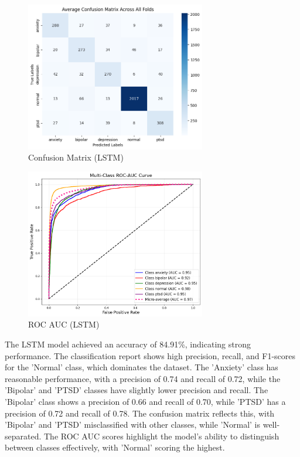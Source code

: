 \vspace{0.1em}

\begin{figure}[h!]  
    \centering
    \includegraphics[width=0.7\textwidth]{Images/LSTM Confusion Matrix.png}  
    \caption{Confusion Matrix (LSTM)}
    \label{LSTMCM}  %
\end{figure}

\begin{figure}[h!]  
    \centering
    \includegraphics[width=0.7\textwidth]{Images/LSTM ROC.png}  
    \caption{ROC AUC (LSTM)}
    \label{LSTMROC}  %
\end{figure}

\noindent
The LSTM model achieved an accuracy of 84.91\%, indicating strong performance. The classification report shows high precision, recall, and F1-scores for the 'Normal' class, which dominates the dataset. The 'Anxiety' class has reasonable performance, with a precision of 0.74 and recall of 0.72, while the 'Bipolar' and 'PTSD' classes have slightly lower precision and recall. The 'Bipolar' class shows a precision of 0.66 and recall of 0.70, while 'PTSD' has a precision of 0.72 and recall of 0.78. The confusion matrix reflects this, with 'Bipolar' and 'PTSD' misclassified with other classes, while 'Normal' is well-separated. The ROC AUC scores highlight the model's ability to distinguish between classes effectively, with 'Normal' scoring the highest.


